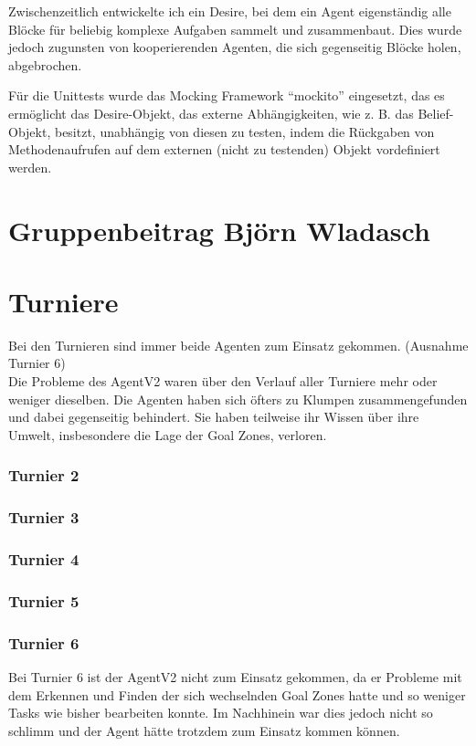 \documentclass[runningheads]{llncs}
\begin{document}
Zwischenzeitlich entwickelte ich ein Desire, bei dem ein Agent eigenständig alle Blöcke für beliebig komplexe Aufgaben sammelt und zusammenbaut. Dies wurde jedoch zugunsten von kooperierenden Agenten, die sich gegenseitig Blöcke holen, abgebrochen.

Für die Unittests wurde das Mocking Framework "`mockito"' eingesetzt, das es ermöglicht das Desire-Objekt, das externe Abhängigkeiten, wie z. B. das Belief-Objekt, besitzt, unabhängig von diesen zu testen, indem die Rückgaben von Methodenaufrufen auf dem externen (nicht zu testenden) Objekt vordefiniert werden. 

\section{Gruppenbeitrag Björn Wladasch}

\section{Turniere}
Bei den Turnieren sind immer beide Agenten zum Einsatz gekommen. (Ausnahme Turnier 6)\\
Die Probleme des AgentV2 waren über den Verlauf aller Turniere mehr oder weniger dieselben.  Die Agenten haben sich öfters zu Klumpen zusammengefunden und dabei gegenseitig behindert. Sie haben teilweise ihr Wissen über ihre Umwelt, insbesondere die Lage der Goal Zones, verloren. 

\subsubsection{Turnier 2}
\subsubsection{Turnier 3}
\subsubsection{Turnier 4}
\subsubsection{Turnier 5}
\subsubsection{Turnier 6\\}
Bei Turnier 6 ist der AgentV2 nicht zum Einsatz gekommen, da er Probleme mit dem Erkennen und Finden der sich wechselnden Goal Zones hatte und so weniger Tasks wie bisher bearbeiten konnte. Im Nachhinein war dies jedoch nicht so schlimm und der Agent hätte trotzdem zum Einsatz kommen können. 
\end{document}
